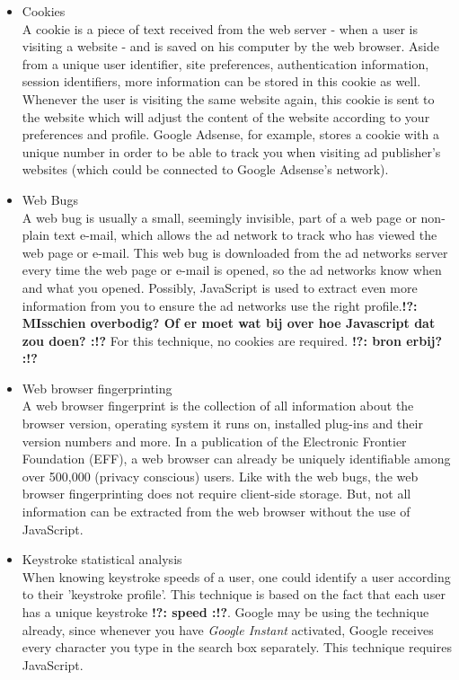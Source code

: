 \documentclass[11pt]{article}
\newcommand{\tocheck}[1]{{\bf !?: #1 :!?}}
\begin{document}
\begin{itemize}
	\item Cookies\\
		A cookie is a piece of text received from the web server - when a user is visiting a website - and is saved on his computer by the web browser. Aside from a unique user identifier, site preferences, authentication information, session identifiers, more information can be stored in this cookie as well. Whenever the user is visiting the same website again, this cookie is sent to the website which will adjust the content of the website according to your preferences and profile. Google Adsense, for example, stores a cookie with a unique number in order to be able to track you when visiting ad publisher's websites (which could be connected to Google Adsense's network). \cite{Adsense2011}

	\item Web Bugs\\
		A web bug is usually a small, seemingly invisible, part of a web page or non-plain text e-mail, which allows the ad network to track who has viewed the web page or e-mail. This web bug is downloaded from the ad networks server every time the web page or e-mail is opened, so the ad networks know when and what you opened. Possibly, JavaScript is used to extract even more information from you to ensure the ad networks use the right profile.\tocheck{MIsschien overbodig? Of er moet wat bij over hoe Javascript dat zou doen?} For this technique, no cookies are required. \tocheck{bron erbij?}

	\item Web browser fingerprinting\\
		A web browser fingerprint is the collection of all information about the browser version, operating system it runs on, installed plug-ins and their version numbers and more. In a publication of the Electronic Frontier Foundation (EFF), a web browser can already be uniquely identifiable among over 500,000 (privacy conscious) users. \cite{EFF2010} Like with the web bugs, the web browser fingerprinting does not require client-side storage. But, not all information can be extracted from the web browser without the use of JavaScript.

	\item Keystroke statistical analysis\\
		When knowing keystroke speeds of a user, one could identify a user according to their 'keystroke profile'. This technique is based on the fact that each user has a unique keystroke \tocheck{speed}. Google may be using the technique already, since whenever you have \textit{Google Instant} activated, Google receives every character you type in the search box separately. \cite{GoogleInstant} This technique requires JavaScript. 
\end{itemize}
\end{document}
